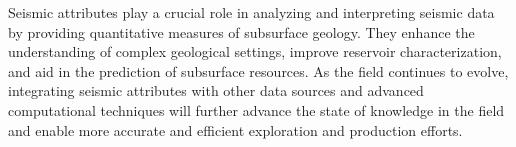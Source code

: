 Seismic attributes play a crucial role in analyzing and interpreting seismic data by providing quantitative measures of subsurface geology.
They enhance the understanding of complex geological settings, improve reservoir characterization, and aid in the prediction of subsurface resources.
As the field continues to evolve, integrating seismic attributes with other data sources and advanced computational techniques will further advance the state of knowledge in the field and enable more accurate and efficient exploration and production efforts.
